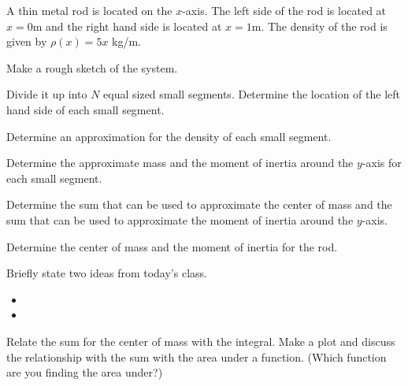 \begin{problem}
\item A thin metal rod is located on the $x$-axis. The left side of
  the rod is located at $x=0$m and the right hand side is located at
  $x=1$m. The density of the rod is given by $\rho(x)=5x$ kg/m.
  \begin{subproblem}
    \item Make a rough sketch of the system.
      \vfill
    \item Divide it up into $N$ equal sized small segments. Determine
      the location of the left hand side of each small segment.
      \vfill
    \item Determine an approximation for the density of each small
      segment.
      \vfill
    \item Determine the approximate mass and the moment of inertia
      around the $y$-axis for each small segment.  
      \vfill

      \clearpage

    \item Determine the sum that can be used to approximate the center
      of mass and the sum that can be used to approximate the moment
      of inertia around the $y$-axis.

      \vspace{6em}

    \item Determine the center of mass and the moment of inertia for
      the rod.

      \vfill

  \end{subproblem}
\end{problem}

\postClass

\begin{problem}
\item Briefly state two ideas from today's class.
  \begin{itemize}
  \item 
  \item 
  \end{itemize}
\item Relate the sum for the center of mass with the integral. Make a
  plot and discuss the relationship with the sum with the area under a
  function. (Which function are you finding the area under?)

  \vfill
\end{problem}


